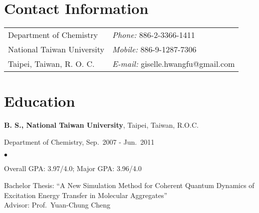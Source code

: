 \documentclass[margin,line, 11pt, a4paper]{res}
\newenvironment{list1}{
  \begin{list}{\ding{113}}{%
      \setlength{\itemsep}{0in}
      \setlength{\parsep}{0in} \setlength{\parskip}{0in}
      \setlength{\topsep}{0in} \setlength{\partopsep`}{0in} 
      \setlength{\leftmargin}{0.17in}}}{\end{list}}
\newenvironment{list2}{
  \begin{list}{$\bullet$}{%
      \setlength{\itemsep}{0in}
      \setlength{\parsep}{0in} \setlength{\parskip}{0in}
      \setlength{\topsep}{0in} \setlength{\partopsep}{0in} 
      \setlength{\leftmargin}{0.2in}}}{\end{list}}
\begin{document}
\pagestyle{empty}


\begin{resume}
\section{\sc Contact Information}
\vspace{.05in}
\begin{tabular}{@{}p{3.3in}p{4in}}
Department of Chemistry             & {\it Phone:}  886-2-3366-1411 \\            
National Taiwan University           & {\it Mobile:}   886-9-1287-7306 \\         
Taipei, Taiwan, R. O. C.                                & {\it E-mail:} giselle.hwangfu@gmail.com\\         
\end{tabular}

%

\section{\sc Education}
{\bf B. S., National Taiwan University}, Taipei, Taiwan, R.O.C.\\
\vspace*{-.1in}
\begin{list1}
\item[] Department of Chemistry, Sep.~2007 - Jun.~2011 
\begin{list2}
\vspace*{.05in}
\item Overall GPA: 3.97/4.0; Major GPA: 3.96/4.0
\item Bachelor Thesis:  ``A New Simulation Method for Coherent Quantum Dynamics of Excitation Energy Transfer in Molecular Aggregates'' \\ Advisor: Prof.~Yuan-Chung Cheng
\end{list2}
\end{list1}


\end{resume}
\end{document}

